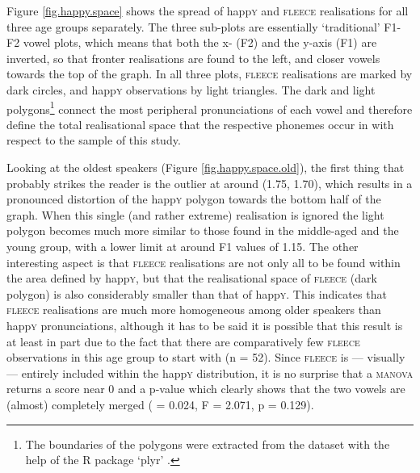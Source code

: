 Figure \ref{fig.happy.space} shows the spread of happ\textsc{y} and \textsc{fleece} realisations for all three age groups separately.
The three sub-plots are essentially `traditional' F1-F2 vowel plots, which means that both the x- (F2) and the y-axis (F1) are inverted, so that fronter realisations are found to the left, and closer vowels towards the top of the graph.
In all three plots, \textsc{fleece} realisations are marked by dark circles, and happ\textsc{y} observations by light triangles.
The dark and light polygons\footnote{The boundaries of the polygons were extracted from the dataset with the help of the R package `plyr' \parencite{plyr}.} connect the most peripheral pronunciations of each vowel and therefore define the total realisational space that the respective phonemes occur in with respect to the sample of this study.

Looking at the oldest speakers (Figure \ref{fig.happy.space.old}), the first thing that probably strikes the reader is the outlier at around (1.75, 1.70), which results in a pronounced distortion of the happ\textsc{y} polygon towards the bottom half of the graph.
When this single (and rather extreme) realisation is ignored the light polygon becomes much more similar to those found in the middle-aged and the young group, with a lower limit at around F1 values of 1.15.
The other interesting aspect is that \textsc{fleece} realisations are not only all to be found within the area defined by happ\textsc{y}, but that the realisational space of \textsc{fleece} (dark polygon) is also considerably smaller than that of happ\textsc{y}.
This indicates that \textsc{fleece} realisations are much more homogeneous among older speakers than happ\textsc{y} pronunciations, although it has to be said it is possible that this result is at least in part due to the fact that there are comparatively few \textsc{fleece} observations in this age group to start with (n = 52).
Since \textsc{fleece} is --- visually --- entirely included within the happ\textsc{y} distribution, it is no surprise that a \textsc{manova} returns a  score near 0 and a p-value which clearly shows that the two vowels are (almost) completely merged ( = 0.024, F = 2.071, p = 0.129).

